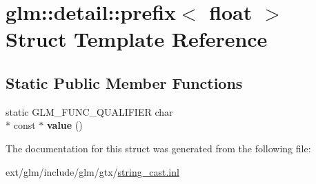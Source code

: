 \hypertarget{structglm_1_1detail_1_1prefix_3_01float_01_4}{\section{glm\-:\-:detail\-:\-:prefix$<$ float $>$ Struct Template Reference}
\label{structglm_1_1detail_1_1prefix_3_01float_01_4}
}
\subsection*{Static Public Member Functions}
\begin{DoxyCompactItemize}
\item 
\hypertarget{structglm_1_1detail_1_1prefix_3_01float_01_4_a106cde8d6d62001a05cbf21367467591}{static G\-L\-M\-\_\-\-F\-U\-N\-C\-\_\-\-Q\-U\-A\-L\-I\-F\-I\-E\-R char \\*
const $\ast$ {\bfseries value} ()}\label{structglm_1_1detail_1_1prefix_3_01float_01_4_a106cde8d6d62001a05cbf21367467591}

\end{DoxyCompactItemize}


The documentation for this struct was generated from the following file\-:\begin{DoxyCompactItemize}
\item 
ext/glm/include/glm/gtx/\hyperlink{string__cast_8inl}{string\-\_\-cast.\-inl}\end{DoxyCompactItemize}
